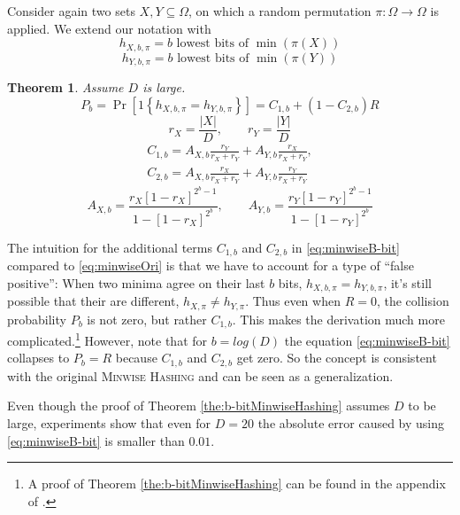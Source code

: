 \documentclass[a4paper]{article}
\newtheorem{mytheorem}{Theorem}
\begin{document}
Consider again two sets $X,Y \subseteq \Omega$, on which a random permutation $\pi: \Omega \longrightarrow \Omega$ is applied. We extend our notation with
\[
h_{X,b,\pi}=b \text{ lowest bits of } \min(\pi(X))
\]
\[
h_{Y,b,\pi}=b \text{ lowest bits of } \min(\pi(Y))
\]
\begin{framed}
\begin{mytheorem} \label{the:b-bitMinwiseHashing}
Assume $D$ is large.
\begin{equation}\label{eq:minwiseB-bit}
P_b=\Pr[1\left\lbrace h_{X,b,\pi}=h_{Y,b,\pi}\right\rbrace]=C_{1,b}+(1-C_{2,b})R
\end{equation}
\begin{equation}
r_X=\frac{|X|}{D}, \qquad r_Y=\frac{|Y|}{D}
\end{equation}
\begin{equation}
\begin{split}
C_{1,b}=A_{X,b}\frac{r_Y}{r_X+r_Y}+A_{Y,b}\frac{r_X}{r_X+r_Y},\\
C_{2,b}=A_{X,b}\frac{r_X}{r_X+r_Y}+A_{Y,b}\frac{r_Y}{r_X+r_Y}
\end{split}
\end{equation}
\begin{equation}
A_{X,b}=\frac{r_X[1-r_X]^{2^b-1}}{1-[1-r_X]^{2^b}}, \qquad A_{Y,b}=\frac{r_Y[1-r_Y]^{2^b-1}}{1-[1-r_Y]^{2^b}}
\end{equation}
\end{mytheorem}
\end{framed}

The intuition for the additional terms $C_{1,b}$ and $C_{2,b}$ in \vref{eq:minwiseB-bit} compared to \vref{eq:minwiseOri} is that we have to account for a type of ``false positive'': When two minima agree on their last $b$ bits, $h_{X,b,\pi}=h_{Y,b,\pi}$, it's still possible that their are different, $h_{X,\pi}\neq h_{Y,\pi}$. Thus even when $R=0$, the collision probability $P_b$ is not zero, but rather $C_{1,b}$. This makes the derivation much more complicated.\footnote{A proof of Theorem \vref{the:b-bitMinwiseHashing} can be found in the appendix of \citep{LiK09}.} However, note that for $b=log(D)$ the equation \vref{eq:minwiseB-bit} collapses to $P_b=R$ because $C_{1,b}$ and $C_{2,b}$ get zero. So the concept is consistent with the original \textsc{Minwise Hashing} and can be seen as a generalization.

Even though the proof of Theorem \vref{the:b-bitMinwiseHashing} assumes $D$ to be large, experiments show that even for $D=20$ the absolute error caused by using \vref{eq:minwiseB-bit} is smaller than $0.01$.
\end{document}
